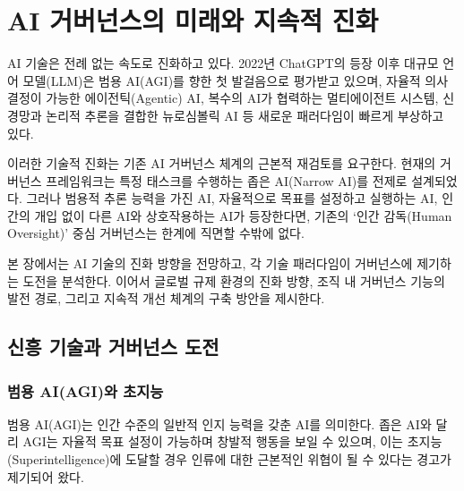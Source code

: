 
\chapter{AI 거버넌스의 미래와 지속적 진화}
\label{ch:future_governance}

AI 기술은 전례 없는 속도로 진화\cite{bengio2024managing}하고 있다. 2022년 ChatGPT의 등장 이후 대규모 언어 모델(LLM)은 범용 AI(AGI)를 향한 첫 발걸음으로 평가받고 있으며, 자율적 의사결정이 가능한 에이전틱(Agentic) AI, 복수의 AI가 협력\cite{askell2019role}하는 멀티에이전트\cite{wei2022emergent} 시스템, 신경망과 논리적 추론을 결합한 뉴로심볼릭\cite{arrieta2020explainable} AI 등 새로운 패러다임이 빠르게 부상하고 있다.

이러한 기술적 진화는 기존 AI 거버넌스 체계의 근본적 재검토\cite{novelli2023taking}를 요구한다. 현재의 거버넌스 프레임워크는 특정 태스크를 수행하는 좁은 AI(Narrow AI)를 전제로 설계되었다. 그러나 범용적 추론 능력을 가진 AI\cite{grace2018when}, 자율적으로 목표를 설정하고 실행하는 AI, 인간의 개입 없이 다른 AI와 상호작용\cite{dafoe2020open}하는 AI가 등장한다면, 기존의 `인간 감독(Human Oversight)' 중심 거버넌스는 한계에 직면할 수밖에 없다.

본 장에서는 AI 기술의 진화 방향을 전망하고, 각 기술 패러다임이 거버넌스에 제기하는 도전을 분석한다. 이어서 글로벌 규제\cite{stix2021actionable}\cite{bradford2020brussels} 환경의 진화 방향, 조직 내 거버넌스 기능의 발전 경로, 그리고 지속적 개선 체계의 구축\cite{floridi2023ethics} 방안을 제시한다.

\section{신흥 기술과 거버넌스 도전}
\label{sec:20.1}

\subsection{범용 AI(AGI)와 초지능}
\label{sec:20.1.1}

범용 AI(AGI)는 인간 수준의 일반적 인지 능력을 갖춘 AI를 의미한다. 좁은 AI와 달리 AGI는 자율적 목표 설정이 가능하며 창발적 행동을 보일 수 있으며, 이는 초지능(Superintelligence)에 도달할 경우 인류에 대한 근본적인 위협이 될 수 있다는 경고가 제기되어 왔다\cite{bostrom2014superintelligence}.


